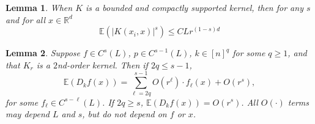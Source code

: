 \documentclass{article}
\newcommand{\Reals}{\mathbb{R}}
\newcommand{\abs}[1]{\left \lvert #1 \right \rvert}
\newcommand{\1}{\mathbf{1}}
\newcommand{\Rd}{\Reals^d}
\newcommand{\Ebb}{\mathbb{E}}
\theoremstyle{alden}
\theoremstyle{aldenthm}
\newtheorem{lemma}{Lemma}
\theoremstyle{definition}
\theoremstyle{remark}
\begin{document}
\begin{lemma}
	\label{lem:expected_kernel}
	When $K$ is a bounded and compactly supported kernel, then for any $s$ and for all $x \in \Rd$
	\begin{equation*}
	\Ebb(\abs{K(x_i,x)}^s) \leq CLr^{(1 - s)d}
	\end{equation*}
\end{lemma}

\begin{lemma}
	\label{lem:leading_term}
	Suppose $f \in C^s(L)$, $p \in C^{s-1}(L)$, $k \in [n]^q$ for some $q \geq 1$, and that $K_r$ is a $2$nd-order kernel. Then if $2q \leq s - 1$,
	\begin{equation}
	\label{eqn:leading_term}
	\Ebb(D_kf(x)) = \sum_{\ell = 2q}^{s - 1} O(r^{\ell}) \cdot f_{\ell}(x) + O(r^s),
	\end{equation}
	for some $f_{\ell} \in C^{s - \ell}(L)$. If $2q \geq s$, $\Ebb(D_kf(x)) = O(r^s)$.  All $O(\cdot)$ terms may depend $L$ and $s$, but do not depend on $f$ or $x$.
\end{lemma}
\end{document}
